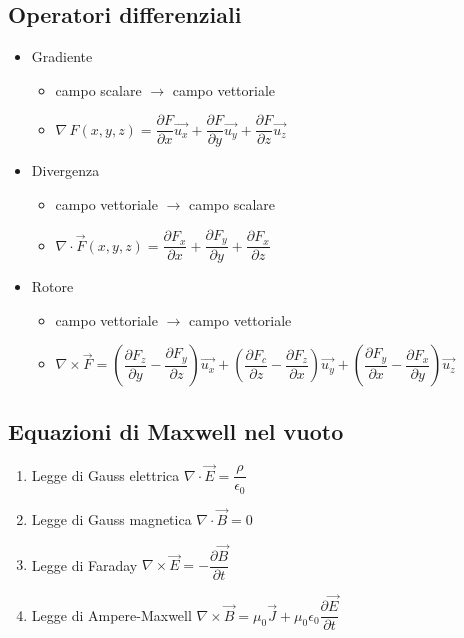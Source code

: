 \documentclass{article}
\begin{document}
\subsection{Operatori differenziali}
\begin{itemize}
	\item Gradiente
	      \begin{itemize}
		      \item campo scalare \(\rightarrow\) campo vettoriale
		      \item \( \nabla \, F(x, y, z) = \dfrac{\partial F}{\partial x} \vec{u_x} +  \dfrac{\partial F}{\partial y} \vec{u_y} + \dfrac{\partial F}{\partial z} \vec{u_z}\)
	      \end{itemize}
	\item Divergenza
	      \begin{itemize}
		      \item campo vettoriale \(\rightarrow\) campo scalare
		      \item \( \nabla \cdot \vec{F}(x, y, z) = \dfrac{\partial F_x}{\partial x} +  \dfrac{\partial F_y}{\partial y} + \dfrac{\partial F_x}{\partial z} \)
	      \end{itemize}
	\item Rotore
	      \begin{itemize}
		      \item campo vettoriale \(\rightarrow\) campo vettoriale
		      \item \( \nabla \times \vec{F} = \left( \dfrac{\partial F_z}{\partial y} -  \dfrac{\partial F_y}{\partial z} \right) \vec{u_x} + \left( \dfrac{\partial F_c}{\partial z} -  \dfrac{\partial F_z}{\partial x} \right) \vec{u_y} + \left( \dfrac{\partial F_y}{\partial x} -  \dfrac{\partial F_x}{\partial y} \right) \vec{u_z} \)
	      \end{itemize}
\end{itemize}

\subsection{Equazioni di Maxwell nel vuoto}
\begin{enumerate}
	\item Legge di Gauss elettrica \( \nabla \cdot \vec{E} = \dfrac{\rho}{\epsilon_0} \)
	\item Legge di Gauss magnetica \( \nabla \cdot \vec{B} = 0 \)
	\item Legge di Faraday \( \nabla \times \vec{E} = - \dfrac{\partial \vec{B}}{\partial t} \)
	\item Legge di Ampere-Maxwell \( \nabla \times \vec{B} = \mu_0 \vec{J} + \mu_0 \epsilon_0 \dfrac{\partial \vec{E}}{\partial t} \)
\end{enumerate}
\end{document}
